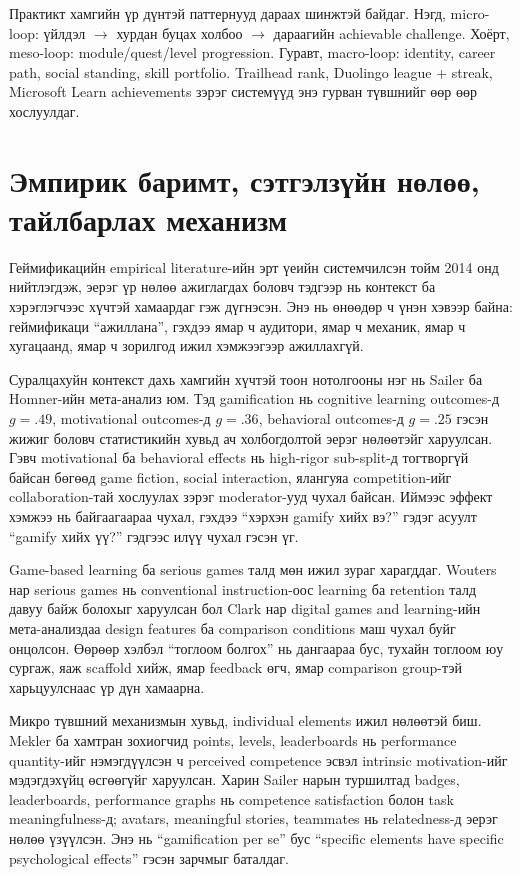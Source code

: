 \begin{sloppy}
Практикт хамгийн үр дүнтэй паттернууд дараах шинжтэй байдаг. Нэгд, micro-loop: үйлдэл $\to$ хурдан буцах холбоо $\to$ дараагийн achievable challenge. Хоёрт, meso-loop: module/quest/level progression. Гуравт, macro-loop: identity, career path, social standing, skill portfolio. Trailhead rank, Duolingo league + streak, Microsoft Learn achievements зэрэг системүүд энэ гурван түвшнийг өөр өөр хослуулдаг.

\section*{Эмпирик баримт, сэтгэлзүйн нөлөө, тайлбарлах механизм}

Геймификацийн empirical literature-ийн эрт үеийн системчилсэн тойм 2014 онд нийтлэгдэж, эерэг үр нөлөө ажиглагдах боловч тэдгээр нь контекст ба хэрэглэгчээс хүчтэй хамаардаг гэж дүгнэсэн. Энэ нь өнөөдөр ч үнэн хэвээр байна: геймификаци ``ажиллана'', гэхдээ ямар ч аудитори, ямар ч механик, ямар ч хугацаанд, ямар ч зорилгод ижил хэмжээгээр ажиллахгүй.

Суралцахуйн контекст дахь хамгийн хүчтэй тоон нотолгооны нэг нь Sailer ба Homner-ийн мета-анализ юм. Тэд gamification нь cognitive learning outcomes-д $g = .49$, motivational outcomes-д $g = .36$, behavioral outcomes-д $g = .25$ гэсэн жижиг боловч статистикийн хувьд ач холбогдолтой эерэг нөлөөтэйг харуулсан. Гэвч motivational ба behavioral effects нь high-rigor sub-split-д тогтворгүй байсан бөгөөд game fiction, social interaction, ялангуяа competition-ийг collaboration-тай хослуулах зэрэг moderator-ууд чухал байсан. Иймээс эффект хэмжээ нь байгаагаараа чухал, гэхдээ ``хэрхэн gamify хийх вэ?'' гэдэг асуулт ``gamify хийх үү?'' гэдгээс илүү чухал гэсэн үг.

Game-based learning ба serious games талд мөн ижил зураг харагддаг. Wouters нар serious games нь conventional instruction-оос learning ба retention талд давуу байж болохыг харуулсан бол Clark нар digital games and learning-ийн мета-анализдаа design features ба comparison conditions маш чухал буйг онцолсон. Өөрөөр хэлбэл ``тоглоом болгох'' нь дангаараа бус, тухайн тоглоом юу сургаж, яаж scaffold хийж, ямар feedback өгч, ямар comparison group-тэй харьцуулснаас үр дүн хамаарна.

Микро түвшний механизмын хувьд, individual elements ижил нөлөөтэй биш. Mekler ба хамтран зохиогчид points, levels, leaderboards нь performance quantity-ийг нэмэгдүүлсэн ч perceived competence эсвэл intrinsic motivation-ийг мэдэгдэхүйц өсгөөгүйг харуулсан. Харин Sailer нарын туршилтад badges, leaderboards, performance graphs нь competence satisfaction болон task meaningfulness-д; avatars, meaningful stories, teammates нь relatedness-д эерэг нөлөө үзүүлсэн. Энэ нь ``gamification per se'' бус ``specific elements have specific psychological effects'' гэсэн зарчмыг баталдаг.


\end{sloppy}
